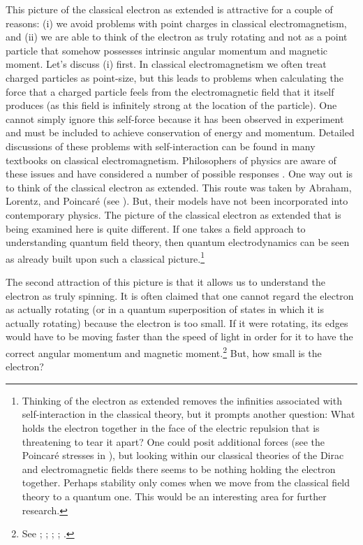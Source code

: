 \documentclass[onecolumn,secnumarabic,amsmath,amssymb,balancelastpage,nofootinbib]{article}
\begin{document}
This picture of the classical electron as extended is attractive for a couple of reasons: (i) we avoid problems with point charges in classical electromagnetism, and (ii) we are able to think of the electron as truly rotating and not as a point particle that somehow possesses intrinsic angular momentum and magnetic moment.  Let's discuss (i) first.  In classical electromagnetism we often treat charged particles as point-size, but this leads to problems when calculating the force that a charged particle feels from the electromagnetic field that it itself produces (as this field is infinitely strong at the location of the particle).  One cannot simply ignore this self-force because it has been observed in experiment and must be included to achieve conservation of energy and momentum.  Detailed discussions of these problems with self-interaction can be found in many textbooks on classical electromagnetism.  Philosophers of physics are aware of these issues and have considered a number of possible responses \citep{lange, frisch2005, lazarovici2018, maudlin2018, hartensteinhubert}.  One way out is to think of the classical electron as extended.  This route was taken by Abraham, Lorentz, and Poincar\'{e} (see \citealp{pearle}).  But, their models have not been incorporated into contemporary physics.  The picture of the classical electron as extended that is being examined here is quite different.  If one takes a field approach to understanding quantum field theory, then quantum electrodynamics can be seen as already built upon such a classical picture.\footnote{Thinking of the electron as extended removes the infinities associated with self-interaction in the classical theory, but it prompts another question: What holds the electron together in the face of the electric repulsion that is threatening to tear it apart?  One could posit additional forces (see the Poincar\'{e} stresses in \citealp[ch.\ 16]{jackson}), but looking within our classical theories of the Dirac and electromagnetic fields there seems to be nothing holding the electron together.  Perhaps stability only comes when we move from the classical field theory to a quantum one.  This would be an interesting area for further research.}

The second attraction of this picture is that it allows us to understand the electron as truly spinning.  It is often claimed that one cannot regard the electron as actually rotating (or in a quantum superposition of states in which it is actually rotating) because the electron is too small.  If it were rotating, its edges would have to be moving faster than the speed of light in order for it to have the correct angular momentum and magnetic moment.\footnote{See \citet[pg.\ 47]{uhlenbeck}; \citet[pg.\ 35]{tomonaga}; \citet[problem 4.25]{griffithsQM}; \citet[pg.\ 127]{rohrlich}; \citet[sec.\ 2]{howelectronsspin}.}  But, how small is the electron?
\end{document}
